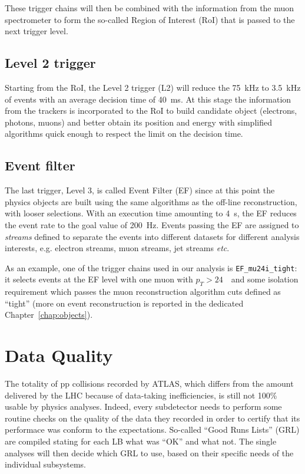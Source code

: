 These trigger chains will then be combined with the information from the
muon spectrometer to form the so-called Region of Interest (RoI) that is
passed to the next trigger level.


\subsection{Level 2 trigger}\label{sec:lvl2}

Starting from the RoI, the Level 2 trigger (L2) will reduce the 75~kHz to
3.5~kHz of events with an average decision time of 40~ms. At this
stage the information from the trackers is incorporated to the RoI
to build candidate object (electrons, photons, muons) and 
better obtain its position and energy with simplified algorithms
quick enough to respect the limit on the decision time.

\subsection{Event filter}\label{sec:lvl3}

The last trigger, Level 3, is called Event Filter (EF) since
at this point the physics objects are built using the same
algorithms as the off-line reconstruction, with looser selections. With an execution time
amounting to 4~s, the EF reduces the event rate to the goal value
of 200~Hz.
Events passing the EF are assigned to {\it streams} defined to separate
the events into different datasets for different analysis interests, e.g.
electron streams, muon streams, jet streams {\it etc}.

As an example, one of the trigger chains used in our analysis is 
\texttt{EF\_mu24i\_tight}: it selects events at the EF level with one 
muon with $p_T>24$~\gev\ and some isolation requirement which passes
the muon reconstruction algorithm cuts defined as ``tight''
(more on event reconstruction is reported in the dedicated Chapter~\ref{chap:objects}).

\section{Data Quality}\label{sec:daq}

The totality of pp collisions recorded by ATLAS, which differs from the amount
delivered by the LHC because of data-taking inefficiencies, is still
not 100\% usable by physics analyses. Indeed, every subdetector needs to
perform some routine checks %
on the quality of the data they recorded in order to certify that its performace
was conform to the expectations. So-called ``Good Runs Lists'' (GRL) are
compiled stating for each LB what was ``OK'' and what not.
The single analyses will then decide which GRL to use, based on their specific
needs of the individual subsystems.
